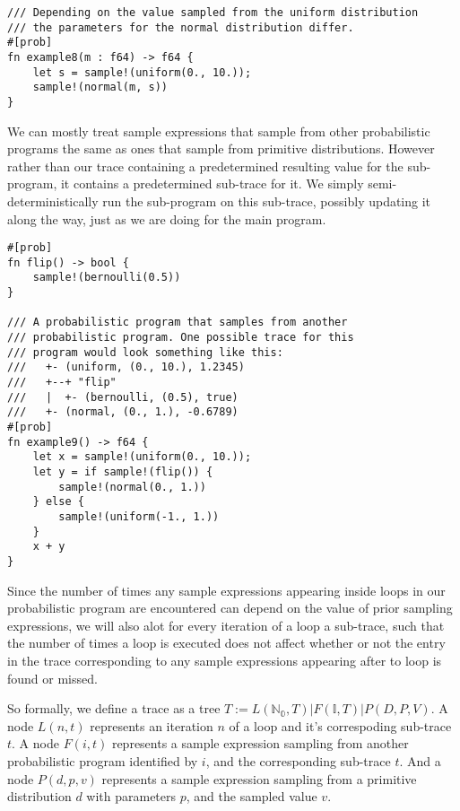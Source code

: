 \begin{minipage}{\linewidth}
\begin{lstlisting}
/// Depending on the value sampled from the uniform distribution
/// the parameters for the normal distribution differ.
#[prob]
fn example8(m : f64) -> f64 {
    let s = sample!(uniform(0., 10.));
    sample!(normal(m, s))
}
\end{lstlisting}
\end{minipage}

We can mostly treat sample expressions that sample from other probabilistic programs the same as ones that sample from primitive distributions. However rather than our trace containing a predetermined resulting value for the sub-program, it contains a predetermined sub-trace for it. We simply semi-deterministically run the sub-program on this sub-trace, possibly updating it along the way, just as we are doing for the main program.

\begin{minipage}{\linewidth}
\begin{lstlisting}
#[prob]
fn flip() -> bool {
    sample!(bernoulli(0.5))
}

/// A probabilistic program that samples from another 
/// probabilistic program. One possible trace for this
/// program would look something like this:
///   +- (uniform, (0., 10.), 1.2345)
///   +--+ "flip"
///   |  +- (bernoulli, (0.5), true)
///   +- (normal, (0., 1.), -0.6789)
#[prob]
fn example9() -> f64 {
    let x = sample!(uniform(0., 10.));
    let y = if sample!(flip()) {
        sample!(normal(0., 1.))
    } else {
        sample!(uniform(-1., 1.))
    }
    x + y
}
\end{lstlisting}
\end{minipage}

Since the number of times any sample expressions appearing inside loops in our probabilistic program are encountered can depend on the value of prior sampling expressions, we will also alot for every iteration of a loop a sub-trace, such that the number of times a loop is executed does not affect whether or not the entry in the trace corresponding to any sample expressions appearing after to loop is found or missed.

So formally, we define a trace as a tree $T := L(\mathbb{N_0}, T) | F(\mathbb{I}, T) | P(D,P,V)$. A node $L(n,t)$ represents an iteration $n$ of a loop and it's correspoding sub-trace $t$. A node $F(i, t)$ represents a sample expression sampling from another probabilistic program identified by $i$, and the corresponding sub-trace $t$. And a node $P(d,p,v)$ represents a sample expression sampling from a primitive distribution $d$ with parameters $p$, and the sampled value $v$.

